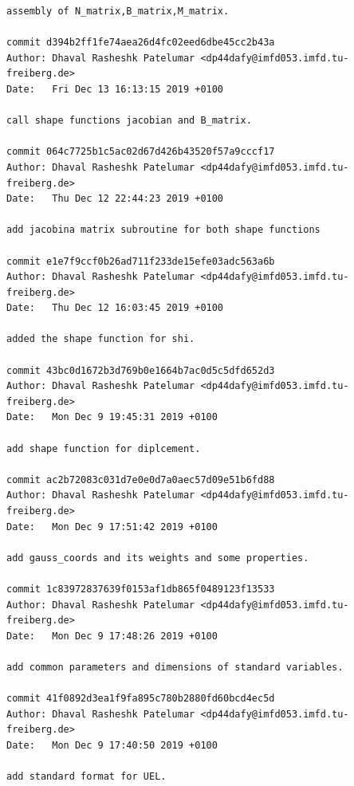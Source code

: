 \documentclass[12pt]{article}
\begin{document}
\begin{appendices}
\begin{verbatim}
assembly of N_matrix,B_matrix,M_matrix.

commit d394b2ff1fe74aea26d4fc02eed6dbe45cc2b43a
Author: Dhaval Rasheshk Patelumar <dp44dafy@imfd053.imfd.tu-freiberg.de>
Date:   Fri Dec 13 16:13:15 2019 +0100

call shape functions jacobian and B_matrix.

commit 064c7725b1c5ac02d67d426b43520f57a9cccf17
Author: Dhaval Rasheshk Patelumar <dp44dafy@imfd053.imfd.tu-freiberg.de>
Date:   Thu Dec 12 22:44:23 2019 +0100

add jacobina matrix subroutine for both shape functions

commit e1e7f9ccf0b26ad711f233de15efe03adc563a6b
Author: Dhaval Rasheshk Patelumar <dp44dafy@imfd053.imfd.tu-freiberg.de>
Date:   Thu Dec 12 16:03:45 2019 +0100

added the shape function for shi.

commit 43bc0d1672b3d769b0e1664b7ac0d5c5dfd652d3
Author: Dhaval Rasheshk Patelumar <dp44dafy@imfd053.imfd.tu-freiberg.de>
Date:   Mon Dec 9 19:45:31 2019 +0100

add shape function for diplcement.

commit ac2b72083c031d7e0e0d7a0aec57d09e51b6fd88
Author: Dhaval Rasheshk Patelumar <dp44dafy@imfd053.imfd.tu-freiberg.de>
Date:   Mon Dec 9 17:51:42 2019 +0100

add gauss_coords and its weights and some properties.

commit 1c83972837639f0153af1db865f0489123f13533
Author: Dhaval Rasheshk Patelumar <dp44dafy@imfd053.imfd.tu-freiberg.de>
Date:   Mon Dec 9 17:48:26 2019 +0100

add common parameters and dimensions of standard variables.

commit 41f0892d3ea1f9fa895c780b2880fd60bcd4ec5d
Author: Dhaval Rasheshk Patelumar <dp44dafy@imfd053.imfd.tu-freiberg.de>
Date:   Mon Dec 9 17:40:50 2019 +0100

add standard format for UEL.

\end{verbatim}

\end{appendices}





















\newpage


\end{document}
